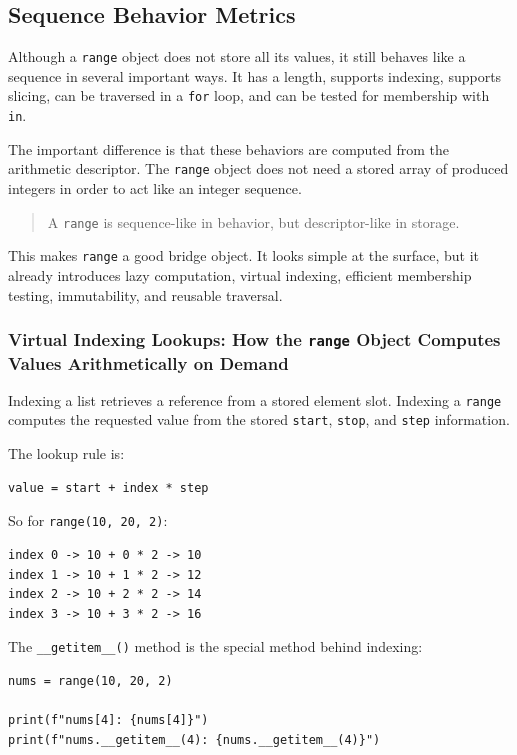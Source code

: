 \subsection{Sequence Behavior Metrics}

Although a \texttt{range} object does not store all its values, it still behaves like a sequence in several important ways. It has a length, supports indexing, supports slicing, can be traversed in a \texttt{for} loop, and can be tested for membership with \texttt{in}.

The important difference is that these behaviors are computed from the arithmetic descriptor. The \texttt{range} object does not need a stored array of produced integers in order to act like an integer sequence.

\begin{quote}
A \texttt{range} is sequence-like in behavior, but descriptor-like in storage.
\end{quote}

This makes \texttt{range} a good bridge object. It looks simple at the surface, but it already introduces lazy computation, virtual indexing, efficient membership testing, immutability, and reusable traversal.

\subsubsection{Virtual Indexing Lookups: How the \texttt{range} Object Computes Values Arithmetically on Demand}

Indexing a list retrieves a reference from a stored element slot. Indexing a \texttt{range} computes the requested value from the stored \texttt{start}, \texttt{stop}, and \texttt{step} information.

The lookup rule is:

\begin{verbatim}
value = start + index * step
\end{verbatim}

So for \texttt{range(10, 20, 2)}:

\begin{verbatim}
index 0 -> 10 + 0 * 2 -> 10
index 1 -> 10 + 1 * 2 -> 12
index 2 -> 10 + 2 * 2 -> 14
index 3 -> 10 + 3 * 2 -> 16
\end{verbatim}

The \texttt{\_\_getitem\_\_()} method is the special method behind indexing:

\begin{verbatim}
nums = range(10, 20, 2)

print(f"nums[4]: {nums[4]}")
print(f"nums.__getitem__(4): {nums.__getitem__(4)}")
\end{verbatim}

